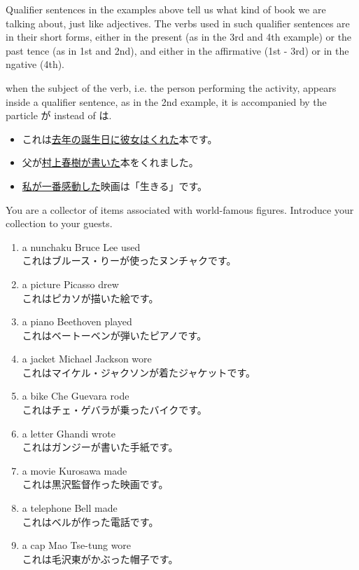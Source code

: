 \documentclass[notoc,notitlepage]{tufte-book}
\begin{document}
\begin{note}
  Qualifier sentences in the examples above tell us what kind of book we are talking about, just like adjectives. The verbs used in such qualifier sentences are in their short forms, either in the present (as in the 3rd and 4th example) or the past tence (as in 1st and 2nd), and either in the affirmative (1st - 3rd) or in the ngative (4th).

   when the subject of the verb, i.e. the person performing the activity, appears inside a qualifier sentence, as in the 2nd example, it is accompanied by the particle が instead of は.
\end{note}

\begin{eg}
  \begin{itemize}
    \item これは\underline{去年の誕生日に彼女はくれた}本です。
    \item 父が\underline{村上春樹が書いた}本をくれました。
    \item \underline{私が一番感動した}映画は「生きる」です。
  \end{itemize}
\end{eg}

\begin{ex}
  You are a collector of items associated with world-famous figures. Introduce your collection to your guests.

  \begin{enumerate}
    \item a nunchaku Bruce Lee used \\
      これはブルース・りーが使ったヌンチャクです。
    \item a picture Picasso drew \\
      これはピカソが描いた絵です。
    \item a piano Beethoven played \\
      これはベートーベンが弾いたピアノです。
    \item a jacket Michael Jackson wore \\
      これはマイケル・ジャクソンが着たジャケットです。
    \item a bike Che Guevara rode \\
      これはチェ・ゲバラが乗ったバイクです。
    \item a letter Ghandi wrote \\
      これはガンジーが書いた手紙です。
    \item a movie Kurosawa made \\
      これは黒沢監督作った映画です。
    \item a telephone Bell made \\
      これはベルが作った電話です。
    \item a cap Mao Tse-tung wore \\
      これは毛沢東がかぶった帽子です。
  \end{enumerate}
\end{ex}
\end{document}
